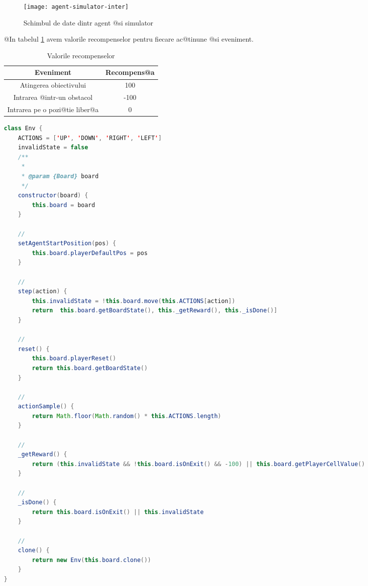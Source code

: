 \begin{figure}[h]
	\centering
	\texttt{[image: agent-simulator-inter]}
	\caption{Schimbul de date dintr agent @si simulator}
	\label{fig:agent-simulator-inter}
\end{figure}

@In tabelul \ref{fig:tabel-recompense} avem valorile recompenselor pentru fiecare ac@tinune @si eveniment.

\begin{table}[H]
	\begin{center}
		\begin{tabular}{|c|c|} 
			\hline
			Eveniment & Recompens@a \\
			\hline
			Atingerea obiectivului & 100 \\
			\hline
			Intrarea @intr-un obstacol & -100 \\
			\hline
			Intrarea pe o pozi@tie liber@a & 0 \\
			\hline
		\end{tabular}
	\end{center}
	\caption{Valorile recompenselor}
	\label{fig:tabel-recompense}
\end{table}




\begin{lstlisting}[language=Java, caption=Definirea clasei Env]
class Env {
    ACTIONS = ['UP', 'DOWN', 'RIGHT', 'LEFT']
    invalidState = false
    /**
     * 
     * @param {Board} board 
     */
    constructor(board) {
        this.board = board
    }

    //
    setAgentStartPosition(pos) {
        this.board.playerDefaultPos = pos
    }

    // 
    step(action) {
        this.invalidState = !this.board.move(this.ACTIONS[action])
        return  this.board.getBoardState(), this._getReward(), this._isDone()]
    }

    //
    reset() {
        this.board.playerReset()
        return this.board.getBoardState()
    }

    //
    actionSample() {
        return Math.floor(Math.random() * this.ACTIONS.length)
    }

    //
    _getReward() {
        return (this.invalidState && !this.board.isOnExit() && -100) || this.board.getPlayerCellValue()
    }

    //
    _isDone() {
        return this.board.isOnExit() || this.invalidState
    }

    //
    clone() {
        return new Env(this.board.clone())
    }
}
\end{lstlisting}


